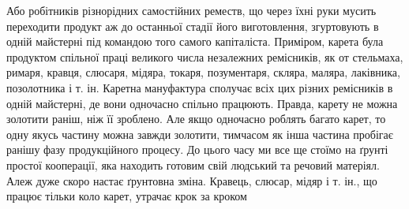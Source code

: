 Або робітників різнорідних самостійних реместв, що через
їхні руки мусить переходити продукт аж до останньої стадії його
виготовлення, згуртовують в одній майстерні під командою того
самого капіталіста. Приміром, карета була продуктом спільної
праці великого числа незалежних ремісників, як от стельмаха,
римаря, кравця, слюсаря, мідяра, токаря, позументаря, скляра,
маляра, лаківника, позолотника і т. ін. Каретна мануфактура
сполучає всіх цих різних ремісників в одній майстерні, де вони
одночасно спільно працюють. Правда, карету не можна золотити
раніш, ніж її зроблено. Але якщо одночасно роблять багато карет,
то одну якусь частину можна завжди золотити, тимчасом як
інша частина пробігає ранішу фазу продукційного процесу. До
цього часу ми все ще стоїмо на ґрунті простої кооперації, яка
находить готовим свій людський та речовий матеріял. Алеж
дуже скоро настає ґрунтовна зміна. Кравець, слюсар, мідяр і
т. ін., що працює тільки коло карет, утрачає крок за кроком
\parbreak{}  %
